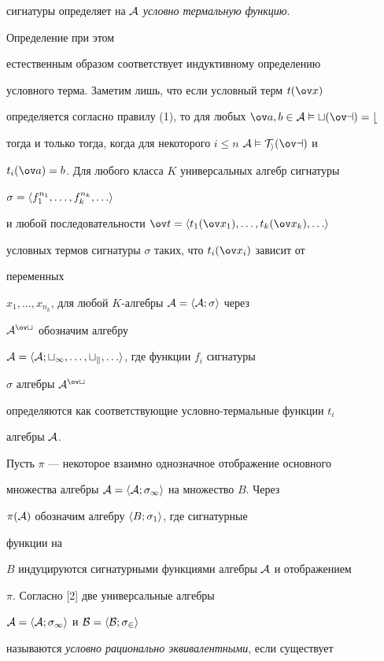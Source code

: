 сигнатуры определяет на $\cal A$ {\it условно термальную функцию}.


Определение при этом


естественным образом соответствует индуктивному определению 


условного терма. Заметим лишь, что если условный терм $t(\ov x)$ 


определяется согласно правилу (1), то для любых $\ov a,b\in\cal A\vDash 


t(\ov a)=b$ 


тогда и только тогда, когда для некоторого $i\le n$\; $\cal A\vDash\cal 


T_i(\ov a)$ и 


$t_i(\ov a)=b$. Для любого класса $K$ универсальных алгебр сигнатуры 


$\sigma=\la f^{n_1}_1,\dotsc,f^{n_k}_k,\dotsc\ra$ 


и любой последовательности $\ov t=\la t_1(\ov x_1),\dotsc,t_k(\ov 


x_k),\dotsc\ra$ 


условных термов сигнатуры $\sigma$ таких, что $t_i(\ov x_i)$ зависит от 


переменных 


$x_1,\dotsc,x_{n_k}$, для любой $K$-алгебры $\cal A=\langle A;\sigma\rangle$ через 


$\cal A^{\ov t}$ обозначим алгебру 


$\cal A=\la A;t_1,\dotsc,t_k,\dotsc\ra$, где функции $f_i$ сигнатуры 


$\sigma$ алгебры $\cal A^{\ov t}$ 


определяются как соответствующие условно-термальные функции $t_i$ 


алгебры $\cal A$. 


 


Пусть $\pi$ --- некоторое взаимно однозначное отображение основного 


множества алгебры $\cal A=\langle A;\sigma_1\rangle$ на множество $B$. Через 


$\pi(\cal A)$ обозначим алгебру $\langle B;\sigma_1\rangle$, где сигнатурные 


функции на 


$B$ индуцируются сигнатурными функциями алгебры $\cal A$ и отображением 


$\pi$. Согласно [2] две универсальные алгебры 


$\cal A=\langle A;\sigma_1\rangle$ и $\cal B=\langle B;\sigma_2\rangle$ 


называются {\it условно рационально эквивалентными}, если существует 


